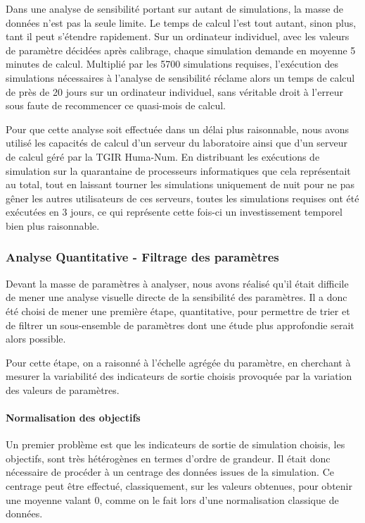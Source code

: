 Dans une analyse de sensibilité portant sur autant de simulations, la masse de données n'est pas la seule limite.
Le temps de calcul l'est tout autant, sinon plus, tant il peut s'étendre rapidement.
Sur un ordinateur individuel, avec les valeurs de paramètre décidées après calibrage, chaque simulation demande en moyenne 5 minutes de calcul.
Multiplié par les 5700 simulations requises, l'exécution des simulations nécessaires à l'analyse de sensibilité réclame alors un temps de calcul de près de 20 jours sur un ordinateur individuel, sans véritable droit à l'erreur sous faute de recommencer ce quasi-mois de calcul.

Pour que cette analyse soit effectuée dans un délai plus raisonnable, nous avons utilisé les capacités de calcul d'un serveur du laboratoire ainsi que d'un serveur de calcul géré par la TGIR Huma-Num.
En distribuant les exécutions de simulation sur la quarantaine de processeurs informatiques que cela représentait au total, tout en laissant tourner les simulations uniquement de nuit pour ne pas gêner les autres utilisateurs de ces serveurs, toutes les simulations requises ont été exécutées en 3 jours, ce qui représente cette fois-ci un investissement temporel bien plus raisonnable.

\subsubsection{Analyse Quantitative - Filtrage des paramètres}

Devant la masse de paramètres à analyser, nous avons réalisé qu'il était difficile de mener une analyse visuelle directe de la sensibilité des paramètres.
Il a donc été choisi de mener une première étape, quantitative, pour permettre de trier et de filtrer un sous-ensemble de paramètres dont une étude plus approfondie serait alors possible.

Pour cette étape, on a raisonné à l'échelle agrégée du paramètre, en cherchant à mesurer la variabilité des indicateurs de sortie choisis provoquée par la variation des valeurs de paramètres.

\paragraph{Normalisation des objectifs}

Un premier problème est que les indicateurs de sortie de simulation choisis, les objectifs, sont très hétérogènes en termes d'ordre de grandeur.
Il était donc nécessaire de procéder à un \og centrage\fg{} des données issues de la simulation.
Ce centrage peut être effectué, classiquement, sur les valeurs obtenues, pour obtenir une moyenne valant 0, comme on le fait lors d'une normalisation classique de données.

